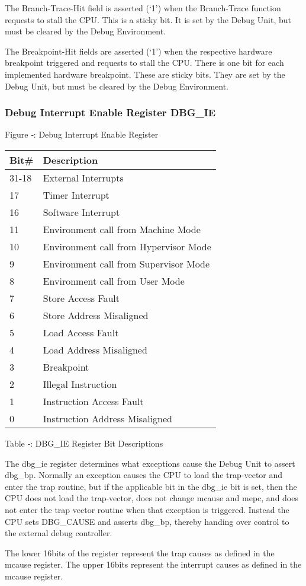 The Branch-Trace-Hit field is asserted (`1') when the Branch-Trace
function requests to stall the CPU. This is a sticky bit. It is set by
the Debug Unit, but must be cleared by the Debug Environment.

The Breakpoint-Hit fields are asserted (`1') when the respective
hardware breakpoint triggered and requests to stall the CPU. There is
one bit for each implemented hardware breakpoint. These are sticky bits.
They are set by the Debug Unit, but must be cleared by the Debug
Environment.

\subsubsection{Debug Interrupt Enable Register
DBG\_IE}\label{debug-interrupt-enable-register-dbg_ie}

\missingfigure{}

Figure ‑: Debug Interrupt Enable Register

\begin{longtable}[]{@{}ll@{}}
\toprule
Bit\# & Description\tabularnewline
\midrule
\endhead
31-18 & External Interrupts\tabularnewline
17 & Timer Interrupt\tabularnewline
16 & Software Interrupt\tabularnewline
11 & Environment call from Machine Mode\tabularnewline
10 & Environment call from Hypervisor Mode\tabularnewline
9 & Environment call from Supervisor Mode\tabularnewline
8 & Environment call from User Mode\tabularnewline
7 & Store Access Fault\tabularnewline
6 & Store Address Misaligned\tabularnewline
5 & Load Access Fault\tabularnewline
4 & Load Address Misaligned\tabularnewline
3 & Breakpoint\tabularnewline
2 & Illegal Instruction\tabularnewline
1 & Instruction Access Fault\tabularnewline
0 & Instruction Address Misaligned\tabularnewline
\bottomrule
\end{longtable}

Table ‑: DBG\_IE Register Bit Descriptions

The dbg\_ie register determines what exceptions cause the Debug Unit to
assert dbg\_bp. Normally an exception causes the CPU to load the
trap-vector and enter the trap routine, but if the applicable bit in the
dbg\_ie bit is set, then the CPU does not load the trap-vector, does not
change mcause and mepc, and does not enter the trap vector routine when
that exception is triggered. Instead the CPU sets DBG\_CAUSE and asserts
dbg\_bp, thereby handing over control to the external debug controller.

The lower 16bits of the register represent the trap causes as defined in
the mcause register. The upper 16bits represent the interrupt causes as
defined in the mcause register.

